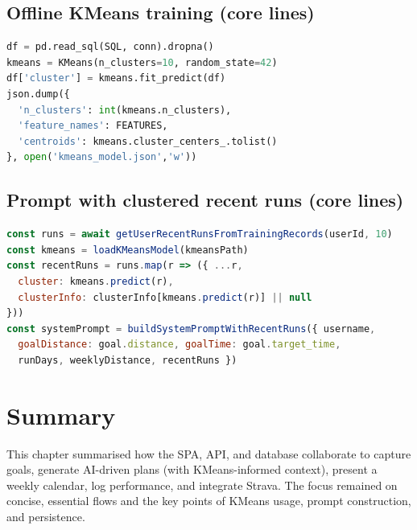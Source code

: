 \subsection{Offline KMeans training (core lines)}
\begin{lstlisting}[language=Python]
df = pd.read_sql(SQL, conn).dropna()
kmeans = KMeans(n_clusters=10, random_state=42)
df['cluster'] = kmeans.fit_predict(df)
json.dump({
  'n_clusters': int(kmeans.n_clusters),
  'feature_names': FEATURES,
  'centroids': kmeans.cluster_centers_.tolist()
}, open('kmeans_model.json','w'))
\end{lstlisting}

\subsection{Prompt with clustered recent runs (core lines)}
\begin{lstlisting}[language=JavaScript]
const runs = await getUserRecentRunsFromTrainingRecords(userId, 10)
const kmeans = loadKMeansModel(kmeansPath)
const recentRuns = runs.map(r => ({ ...r,
  cluster: kmeans.predict(r),
  clusterInfo: clusterInfo[kmeans.predict(r)] || null
}))
const systemPrompt = buildSystemPromptWithRecentRuns({ username,
  goalDistance: goal.distance, goalTime: goal.target_time,
  runDays, weeklyDistance, recentRuns })
\end{lstlisting}

\section{Summary}
This chapter summarised how the SPA, API, and database collaborate to capture goals, generate AI-driven plans (with KMeans-informed context), present a weekly calendar, log performance, and integrate Strava. The focus remained on concise, essential flows and the key points of KMeans usage, prompt construction, and persistence.
